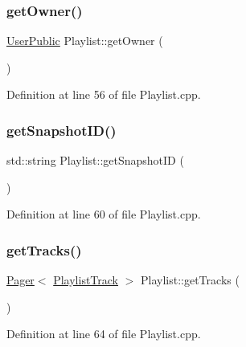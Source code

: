\subsubsection{\texorpdfstring{get\+Owner()}{getOwner()}}
{\footnotesize\ttfamily \mbox{\hyperlink{class_user_public}{User\+Public}} Playlist\+::get\+Owner (\begin{DoxyParamCaption}{ }\end{DoxyParamCaption})}



Definition at line 56 of file Playlist.\+cpp.

\mbox{\label{class_playlist_a14852f4a0b9af8e75a4833dc2e723a55}} 
\subsubsection{\texorpdfstring{get\+Snapshot\+I\+D()}{getSnapshotID()}}
{\footnotesize\ttfamily std\+::string Playlist\+::get\+Snapshot\+ID (\begin{DoxyParamCaption}{ }\end{DoxyParamCaption})}



Definition at line 60 of file Playlist.\+cpp.

\mbox{\label{class_playlist_a326bbf1003a1473fba8d54dbf48f4eb1}} 
\subsubsection{\texorpdfstring{get\+Tracks()}{getTracks()}}
{\footnotesize\ttfamily \mbox{\hyperlink{class_pager}{Pager}}$<$ \mbox{\hyperlink{class_playlist_track}{Playlist\+Track}} $>$ Playlist\+::get\+Tracks (\begin{DoxyParamCaption}{ }\end{DoxyParamCaption})}



Definition at line 64 of file Playlist.\+cpp.

\mbox{\label{class_playlist_a3704ccb176d9c3fb820f75328958f4b0}} 

